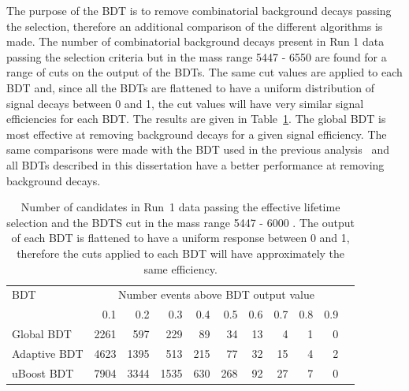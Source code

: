 The purpose of the BDT is to remove combinatorial background decays passing the \bsmumu selection, therefore an additional comparison of the different algorithms is made. The number of combinatorial background decays present in Run 1 data passing the \el selection criteria but in the mass range 5447 - 6550 \mevcc are found for a range of cuts on the output of the BDTs. %
The same cut values are applied to each BDT and, since all the BDTs are flattened to have a uniform distribution of signal decays between 0 and 1, the cut values will have very similar signal efficiencies for each BDT. %
The results are given in Table~\ref{tab:bkgdsC}. The global BDT is most effective at removing background decays for a given signal efficiency.
The same comparisons were made with the BDT used in the previous analysis~\cite{Aaij:2013aka, CMS:2014xfa} and all BDTs described in this dissertation have a better performance at removing background decays. 




\begin{table}[tbp]
\begin{center}
\begin{tabular}{lrrrrrrrrrr}
\toprule \toprule
BDT & \multicolumn{9}{c}{Number events above BDT output value}  \\
\cmidrule{2-10}
   & 0.1 & 0.2 & 0.3 & 0.4 & 0.5 & 0.6 & 0.7 & 0.8 & 0.9 \\ \midrule
Global BDT  & 2261 & 597 & 229 & 89 & 34 & 13 & 4 & 1 & 0 \\ 
Adaptive BDT  & 4623 & 1395 & 513 & 215 & 77 & 32 & 15 & 4 & 2 \\
uBoost BDT & 7904 & 3344 & 1535 &630 & 268 & 92 & 27 & 7 & 0 \\
\bottomrule \bottomrule
\end{tabular}
\vspace{0.7cm}
\vspace{0.7cm}
\caption{Number of candidates in Run~1 data passing the effective lifetime selection and the BDTS cut in the mass range 5447 - 6000 \mevcc. The output of each BDT is flattened to have a uniform response between 0 and 1, therefore the cuts applied to each BDT will have approximately the same efficiency.}
\label{tab:bkgdsC}
\end{center}
\vspace{-1.0cm}
\end{table}


